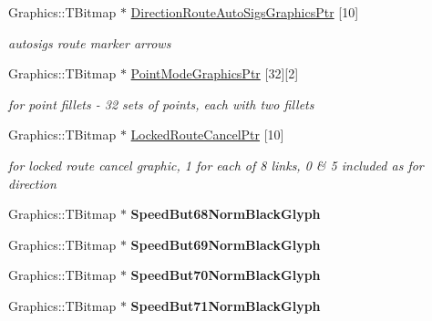 \begin{DoxyCompactItemize}
Graphics\+::\+T\+Bitmap $\ast$ \mbox{\hyperlink{class_t_rail_graphics_ab0775db98387eb5c22ba0b1f4daa8efe}{Direction\+Route\+Auto\+Sigs\+Graphics\+Ptr}} \mbox{[}10\mbox{]}
\begin{DoxyCompactList}\small\item\em autosigs route marker arrows \end{DoxyCompactList}\item 
\mbox{\label{class_t_rail_graphics_a962b7f59eb1abaa7f80989e783e3f02a}} 
Graphics\+::\+T\+Bitmap $\ast$ \mbox{\hyperlink{class_t_rail_graphics_a962b7f59eb1abaa7f80989e783e3f02a}{Point\+Mode\+Graphics\+Ptr}} \mbox{[}32\mbox{]}\mbox{[}2\mbox{]}
\begin{DoxyCompactList}\small\item\em for point fillets -\/ 32 sets of points, each with two fillets \end{DoxyCompactList}\item 
\mbox{\label{class_t_rail_graphics_a10379722f35b86436020ca874744c339}} 
Graphics\+::\+T\+Bitmap $\ast$ \mbox{\hyperlink{class_t_rail_graphics_a10379722f35b86436020ca874744c339}{Locked\+Route\+Cancel\+Ptr}} \mbox{[}10\mbox{]}
\begin{DoxyCompactList}\small\item\em for locked route cancel graphic, 1 for each of 8 links, 0 \& 5 included as for direction \end{DoxyCompactList}\item 
\mbox{\label{class_t_rail_graphics_abe8d5e5e23696a9b940b80bd905b0416}} 
Graphics\+::\+T\+Bitmap $\ast$ {\bfseries Speed\+But68\+Norm\+Black\+Glyph}
\item 
\mbox{\label{class_t_rail_graphics_ac5d408c66785ce7cf034076a37aaefed}} 
Graphics\+::\+T\+Bitmap $\ast$ {\bfseries Speed\+But69\+Norm\+Black\+Glyph}
\item 
\mbox{\label{class_t_rail_graphics_ae345b580dc92db627f7c378d7ca5ed97}} 
Graphics\+::\+T\+Bitmap $\ast$ {\bfseries Speed\+But70\+Norm\+Black\+Glyph}
\item 
\mbox{\label{class_t_rail_graphics_ae4dca7933577de83a2053b61f18bfa97}} 
Graphics\+::\+T\+Bitmap $\ast$ {\bfseries Speed\+But71\+Norm\+Black\+Glyph}

\end{DoxyCompactItemize}
